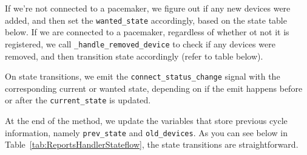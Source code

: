 \documentclass[12pt]{article}
\begin{document}
If we're not connected to a pacemaker, we figure out if any new devices were added, and then set the \verb|wanted_state| accordingly, based on the state table below.
If we are connected to a pacemaker, regardless of whether ot not it is registered, we call \verb|_handle_removed_device| to check if any devices were removed, and then transition state accordingly (refer to table below).

On state transitions, we emit the \verb|connect_status_change| signal with the corresponding current or wanted state, depending on if the emit happens before or after the \verb|current_state| is updated.

At the end of the method, we update the variables that store previous cycle information, namely \verb|prev_state| and \verb|old_devices|.
As you can see below in Table~\ref{tab:ReportsHandlerStateflow}, the state transitions are straightforward.
\end{document}

